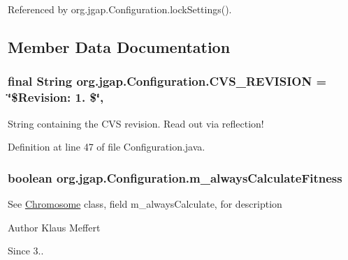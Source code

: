 Referenced by org.\-jgap.\-Configuration.\-lock\-Settings().



\subsection{Member Data Documentation}
\hypertarget{classorg_1_1jgap_1_1_configuration_a0bcf247e3c46ee130429eeb2520d0941}{
\subsubsection[{C\-V\-S\-\_\-\-R\-E\-V\-I\-S\-I\-O\-N}]{\setlength{\rightskip}{0pt plus 5cm}final String org.\-jgap.\-Configuration.\-C\-V\-S\-\_\-\-R\-E\-V\-I\-S\-I\-O\-N = \char`\"{}\$Revision\-: 1. \$\char`\"{}\hspace{0.3cm}{\ttfamily [static]}, {\ttfamily [private]}}}\label{classorg_1_1jgap_1_1_configuration_a0bcf247e3c46ee130429eeb2520d0941}
String containing the C\-V\-S revision. Read out via reflection! 

Definition at line 47 of file Configuration.\-java.

\hypertarget{classorg_1_1jgap_1_1_configuration_a4ba366faf12d528ddcbe0670bf036868}{
\subsubsection[{m\-\_\-always\-Calculate\-Fitness}]{\setlength{\rightskip}{0pt plus 5cm}boolean org.\-jgap.\-Configuration.\-m\-\_\-always\-Calculate\-Fitness\hspace{0.3cm}{\ttfamily [private]}}}\label{classorg_1_1jgap_1_1_configuration_a4ba366faf12d528ddcbe0670bf036868}
See \hyperlink{classorg_1_1jgap_1_1_chromosome}{Chromosome} class, field m\-\_\-always\-Calculate, for description

\begin{DoxyAuthor}{Author}
Klaus Meffert 
\end{DoxyAuthor}
\begin{DoxySince}{Since}
3.. 
\end{DoxySince}


